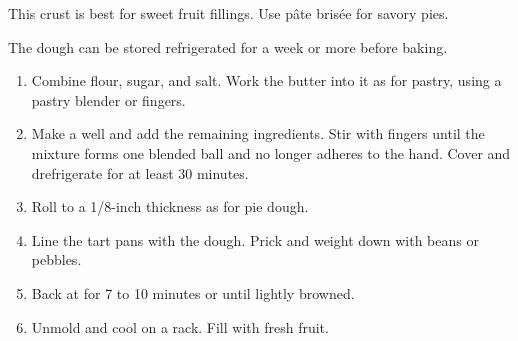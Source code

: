 
\begin{ingredients}
\end{ingredients}


\begin{recipe}

This crust is best for sweet fruit fillings.  Use p\^ate bris\'ee for savory pies.

The dough can be stored refrigerated for a week or more before baking.


  \begin{enumerate}

  \item Combine flour, sugar, and salt.  Work the butter into it as
  for pastry, using a pastry blender or fingers.

\item Make a well and add the remaining ingredients.  Stir with 
  fingers until the mixture forms one blended ball and no longer
  adheres to the hand.  Cover and drefrigerate for at least 30
  minutes.


\item Roll to a 1/8-inch thickness as for pie dough.


\item Line the tart pans with the dough.  Prick and weight down with
  beans or pebbles.

\item Back at  for 7 to 10 minutes or until lightly
  browned.

\item Unmold and cool on a rack.  Fill with fresh fruit.

  \end{enumerate}
\end{recipe}
